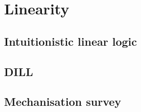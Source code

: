 \chapter{Linearity}\label{sec:linearity}

\section{Intuitionistic linear logic}\label{sec:ill}


\section{DILL}


\section{Mechanisation survey}
